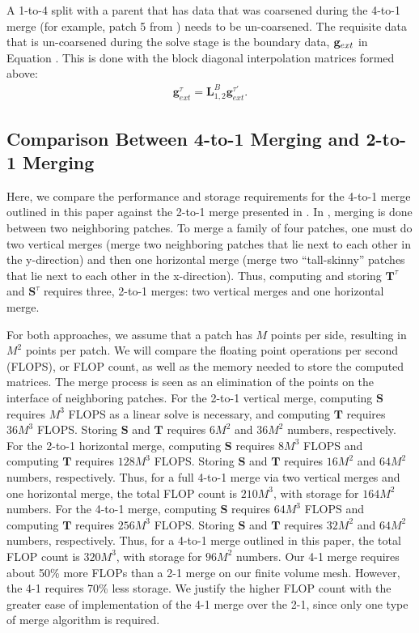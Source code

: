 A 1-to-4 split with a parent that has data that was coarsened during the 4-to-1 merge (for example, patch 5 from ) needs to be un-coarsened. The requisite data that is un-coarsened during the solve stage is the boundary data, $\mathbf g_{ext}$ in Equation . This is done with the block diagonal interpolation matrices formed above:
\begin{align}
    \textbf{g}^{\tau}_{ext} = \textbf{L}_{1,2}^{B} \textbf{g}^{\tau'}_{ext}.
\end{align}

\subsection{Comparison Between 4-to-1 Merging and 2-to-1 Merging}
\label{sub:comparison_between_4t1_and2t1_merging}

Here, we compare the performance and storage requirements for the 4-to-1 merge outlined in this paper against the 2-to-1 merge presented in \citep{gillman2014direct}. In \citep{gillman2014direct}, merging is done between two neighboring patches. To merge a family of four patches, one must do two vertical merges (merge two neighboring patches that lie next to each other in the y-direction) and then one horizontal merge (merge two ``tall-skinny'' patches that lie next to each other in the x-direction). Thus, computing and storing $\textbf{T}^{\tau}$ and $\mathbf{S}^{\tau}$ requires three, 2-to-1 merges: two vertical merges and one horizontal merge.

For both approaches, we assume that a patch has $M$ points per side, resulting in $M^2$ points per patch. We will compare the floating point operations per second (FLOPS), or FLOP count, as well as the memory needed to store the computed matrices. The merge process is seen as an elimination of the points on the interface of neighboring patches. For the 2-to-1 vertical merge, computing $\mathbf{S}$ requires $M^3$ FLOPS as a linear solve is necessary, and computing $\mathbf{T}$ requires $36M^3$ FLOPS. Storing $\mathbf{S}$ and $\mathbf{T}$ requires $6M^2$ and $36M^2$ numbers, respectively. For the 2-to-1 horizontal merge, computing $\mathbf{S}$ requires $8M^3$ FLOPS and computing $\mathbf{T}$ requires $128M^3$ FLOPS. Storing $\mathbf{S}$ and $\mathbf{T}$ requires $16M^2$ and $64M^2$ numbers, respectively. Thus, for a full 4-to-1 merge via two vertical merges and one horizontal merge, the total FLOP count is $210M^3$, with storage for $164M^2$ numbers. For the 4-to-1 merge, computing $\mathbf{S}$ requires $64M^3$ FLOPS and computing $\mathbf{T}$ requires $256M^3$ FLOPS. Storing $\mathbf{S}$ and $\mathbf{T}$ requires $32M^2$ and $64M^2$ numbers, respectively. Thus, for a 4-to-1 merge outlined in this paper, the total FLOP count is $320M^3$, with storage for $96M^2$ numbers.  Our 4-1 merge requires about 50\% more FLOPs  than a 2-1 merge on our finite volume mesh.  However, the 4-1 requires 70\% less storage.  We justify the higher FLOP count with the greater ease of implementation of the 4-1 merge over the 2-1, since only one type of merge algorithm is required.  

